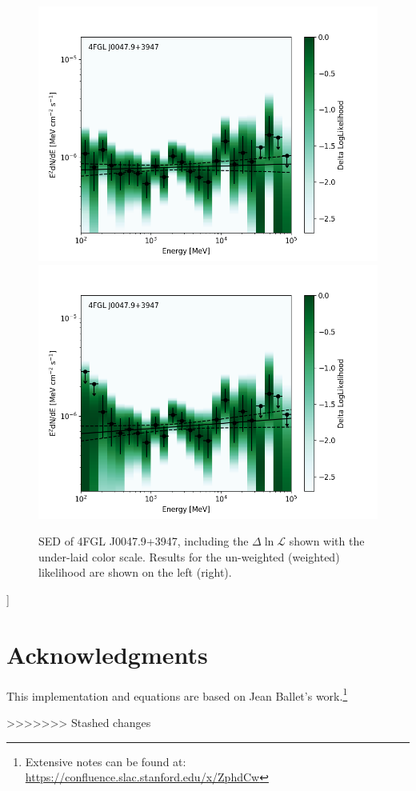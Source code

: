 \documentclass[preprint]{aastex}
\begin{document}
\begin{figure}[h]  
\begin{centering}
\includegraphics[width=0.49\columnwidth]{figures/sed_nowts.png}
\includegraphics[width=0.49\columnwidth]{figures/sed_wts.png}
\vspace{-0.10in}
\caption{\label{fig:sed}SED of 4FGL J0047.9+3947, including the $\Delta\ln\mathcal{L}$ shown
  with the under-laid color scale. Results
  for the un-weighted (weighted) likelihood are shown on the left (right).}
\end{centering}
\end{figure}]


\section{Acknowledgments}

This implementation and equations are based on 
Jean Ballet's work.\footnote{Extensive notes can be found at: \url{https://confluence.slac.stanford.edu/x/ZphdCw}}

>>>>>>> Stashed changes
\end{document}
